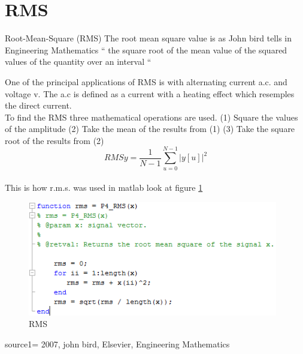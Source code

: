 \section{RMS}
Root-Mean-Square (RMS)
The root mean square value is as John bird tells in Engineering Mathematics \citep{Bird2007} “ the square root of the mean value of the squared values of the quantity over an interval “


One of the principal applications of RMS is with alternating current a.c. and voltage v. The a.c is defined as a current with a heating effect which resemples the direct current. \citep{Bird2007}
\\
To find the RMS three mathematical operations are used.
(1)	Square the values of the amplitude
(2)	Take the mean of the results from (1)
(3)	Take the square root of the results from (2)
\begin{equation}\label{eq:RMS formular}
RMSy = \frac{1}{N-1}\sum_{u=0}^{N-1}|y[u]|^2
\end{equation}
\\
This is how r.m.s. was used in matlab look at figure \ref{RMS}
\begin{figure}
	\begin{center}
		\includegraphics[height=5cm]{fig/RMS_matlabCode.png}
		\caption{RMS}
		\label{RMS}
	\end{center}
\end{figure}

source1= 2007, john bird, Elsevier, Engineering Mathematics
